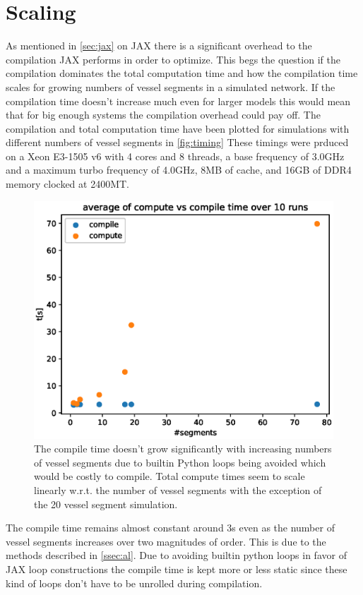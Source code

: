 \documentclass[a4paper, oneside]{discothesis}
\begin{document}
\section{Scaling} \label{sec:sc}
As mentioned in \autoref{sec:jax} on JAX there is a significant overhead to the compilation JAX performs in order to optimize.
This begs the question if the compilation dominates the total computation time and how the compilation time scales for growing numbers of vessel segments in a simulated network.
If the compilation time doesn't increase much even for larger models this would mean that for big enough systems the compilation overhead could pay off.
The compilation and total computation time have been plotted for simulations with different numbers of vessel segments in \autoref{fig:timing}
These timings were prduced on a Xeon E3-1505 v6 with 4 cores and 8 threads, a base frequency of 3.0GHz and a maximum turbo frequency of 4.0GHz, 8MB of cache, and 16GB of DDR4 memory clocked at 2400MT.
\begin{figure} [!ht]
	\centering
	\includegraphics[width=0.8\columnwidth]{figures/timing.eps}
	\caption{The compile time doesn't grow significantly with increasing numbers of vessel segments due to builtin Python loops being avoided which would be costly to compile. Total compute times seem to scale linearly w.r.t. the number of vessel segments with the exception of the 20 vessel segment simulation.}
	\label{fig:timing}
\end{figure}
The compile time remains almost constant around 3s even as the number of vessel segments increases over two magnitudes of order.
This is due to the methods described in \autoref{ssec:al}.
Due to avoiding builtin python loops in favor of JAX loop constructions the compile time is kept more or less static since these kind of loops don't have to be unrolled during compilation.
\end{document}
